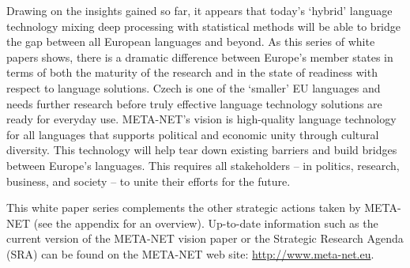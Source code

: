 \begin{multicols}{2}

Drawing on the insights gained so far, it appears that today’s ‘hybrid’ language technology mixing deep processing with statistical methods will be able to bridge the gap between all European languages and beyond. As this series of white papers shows, there is a dramatic difference between Europe’s member states in terms of both the maturity of the research and in the state of readiness with respect to language solutions. Czech is one of the ‘smaller’ EU languages and needs further research before truly effective language technology solutions are ready for everyday use.  META-NET’s vision is high-quality language technology for all languages that supports political and economic unity through cultural diversity. This technology will help tear down existing barriers and build bridges between Europe’s languages. This requires all stakeholders -- in politics, research, business, and society -- to unite their efforts for the future.

This white paper series complements the other strategic actions taken by META-NET (see the appendix for an overview). Up-to-date information such as the current version of the META-NET vision paper \cite{Meta1} or the Strategic Research Agenda (SRA) can be found on the META-NET web site: \url{http://www.meta-net.eu}.
\end{multicols}

\clearpage



